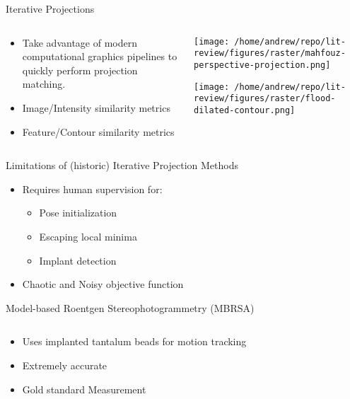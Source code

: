 \documentclass[presentation]{beamer}
\begin{document}
\begin{frame}[label={sec:org7866f20}]{Iterative Projections}
\begin{columns}
\begin{column}{0.5\columnwidth}
\begin{itemize}
\item Take advantage of modern computational graphics pipelines to quickly perform projection matching.
\item Image/Intensity similarity metrics \autocite{mahfouzRobustMethodRegistration2003}
\item Feature/Contour similarity metrics
\end{itemize}
\end{column}
\begin{column}{0.6\columnwidth}
\begin{center}
\texttt{[image: /home/andrew/repo/lit-review/figures/raster/mahfouz-perspective-projection.png]}
\end{center}
\begin{center}
\texttt{[image: /home/andrew/repo/lit-review/figures/raster/flood-dilated-contour.png]}
\end{center}
\end{column}
\end{columns}
\end{frame}
\begin{frame}[label={sec:org63d2973}]{Limitations of (historic) Iterative Projection Methods}
\begin{itemize}
\item Requires human supervision for:
\begin{itemize}
\item Pose initialization
\item Escaping local minima
\item Implant detection
\end{itemize}
\item Chaotic and Noisy objective function
\end{itemize}
\end{frame}

\begin{frame}[label={sec:org99a9022}]{Model-based Roentgen Stereophotogrammetry (MBRSA)}
\begin{columns}
\begin{column}{0.5\columnwidth}
\begin{itemize}
\item Uses implanted tantalum beads for motion tracking \autocite{selvikRoentgenStereophotogrammetryMethod1989}
\item Extremely accurate \autocites{kapteinEvaluationThreePose2004}[][]{saariKneeKinematicsMedial2005}
\item Gold standard Measurement \autocite{brobergValidationMachineLearning2023}
\end{itemize}
\end{column}

\begin{column}{0.6\columnwidth}
\end{column}
\end{columns}
\end{frame}
\end{document}
